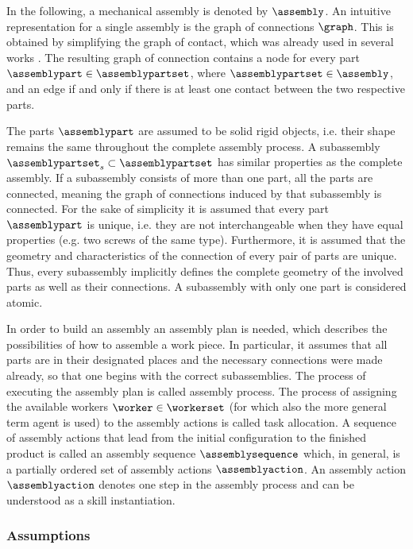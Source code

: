 In the following, a mechanical assembly is denoted by $\assembly$.
An intuitive representation for a single assembly is the graph of connections $\graph$.
This is obtained by simplifying the graph of contact, which was already used in several works \cite{Fazio.1987,HomemdeMello.1989,Huang.1989}.
The resulting graph of connection contains a node for every part $\assemblypart \in \assemblypartset$, where $\assemblypartset \in \assembly$, and an edge if and only if there is at least one contact between the two respective parts.

The parts $\assemblypart$ are assumed to be solid rigid objects, i.e. their shape remains the same throughout the complete assembly process.
A subassembly $\assemblypartset_s \subset \assemblypartset$ has similar properties as the complete assembly.
If a subassembly consists of more than one part, all the parts are connected, meaning the graph of connections induced by that subassembly is connected.
For the sake of simplicity it is assumed that every part $\assemblypart$ is unique, i.e. they are not interchangeable when they have equal properties (e.g. two screws of the same type).
Furthermore, it is assumed that the geometry and characteristics of the connection of every pair of parts are unique.
Thus, every subassembly implicitly defines the complete geometry of the involved parts as well as their connections.
A subassembly with only one part is considered atomic.

In order to build an assembly an assembly plan is needed, which describes the possibilities of how to assemble a work piece.
In particular, it assumes that all parts are in their designated places and the necessary connections were made already, so that one begins with the correct subassemblies.
The process of executing the assembly plan is called assembly process.
The process of assigning the available workers $\worker \in \workerset$ (for which also the more general term agent is used) to the assembly actions is called task allocation.
A sequence of assembly actions that lead from the initial configuration to the finished product is called an assembly sequence $\assemblysequence$ which, in general, is a partially ordered set of assembly actions $\assemblyaction$.
An assembly action $\assemblyaction$ denotes one step in the assembly process and can be understood as a skill instantiation.

\subsubsection{Assumptions}\label{ch:foundations:planning:assumptions}

